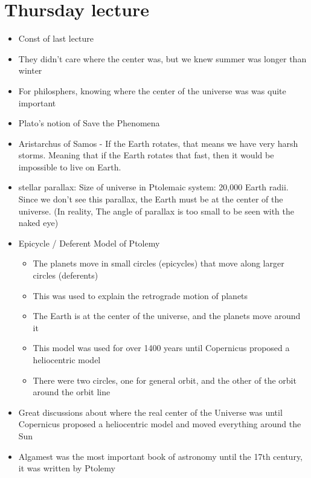 \documentclass{article}
\begin{document}
\section*{Thursday lecture}
\begin{itemize}
  \item Const of last lecture
  \item They didn't care where the center was, but we knew summer was longer than winter
  \item For philosphers, knowing where the center of the universe was was quite
    important
  \item Plato's notion of Save the Phenomena
  \item Aristarchus of Samos - If the Earth rotates, that means we have very harsh storms.
    Meaning that if the Earth rotates that fast, then it would be impossible to live on Earth.
  \item stellar parallax: Size of universe in Ptolemaic system: 20,000 Earth radii.
    Since we don't see this parallax, the Earth must be at the center of the universe.
    (In reality, The angle of parallax is too small to be seen with the naked eye)
  \item Epicycle / Deferent Model of Ptolemy
    \begin{itemize}
      \item The planets move in small circles (epicycles) that move along larger circles (deferents)
      \item This was used to explain the retrograde motion of planets
      \item The Earth is at the center of the universe, and the planets move around it
      \item This model was used for over 1400 years until Copernicus proposed a heliocentric model
      \item There were two circles, one for general orbit, and the other of the orbit around the
        orbit line
    \end{itemize}
  \item Great discussions about where the real center of the Universe
    was until Copernicus proposed a heliocentric model and moved
    everything around the Sun
  \item Algamest was the most important book of astronomy
    until the 17th century, it was written by Ptolemy
\end{itemize}
\end{document}
